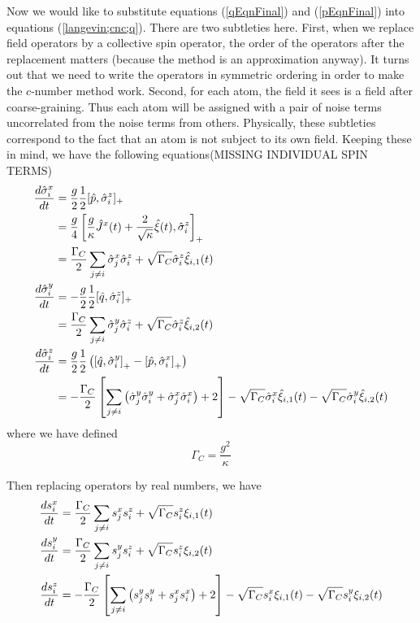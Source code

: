 \documentclass{article}
\newcommand{\gc}{\Gamma_C}
\begin{document}
Now we would like to substitute equations (\ref{qEqnFinal}) and (\ref{pEqnFinal}) into equations (\ref{langevin;cnc;q}). There are two subtleties here. First, when we replace field operators by a collective spin operator, the order of the operators after the replacement matters (because the method is an approximation anyway). It turns out that we need to write the operators in symmetric ordering in order to make the $c$-number method work. Second, for each atom, the field it sees is a field after coarse-graining. Thus each atom will be assigned with a pair of noise terms uncorrelated from the noise terms from others. Physically, these subtleties correspond to the fact that an atom is not subject to its own field. Keeping these in mind, we have the following equations(MISSING INDIVIDUAL SPIN TERMS)
\begin{align}
    \label{xyz}
    \notag \frac{d \hat{\sigma}_i^x}{dt} &= \frac{g}{2}\frac{1}{2}[\hat{p},\hat{\sigma}^z_i]_+\\
    \notag &=\frac{g}{4}\left[\frac{g}{\kappa}\hat{J}^x(t)+\frac{2}{\sqrt{\kappa}}\hat{\xi}(t),\hat{\sigma}^z_i\right]_+\\
          &=\frac{\gc}{2}\sum_{j\neq i}\hat{\sigma}_j^x\hat{\sigma}^z_i+\sqrt{\gc}\hat{\sigma}^z_i\hat{\xi}_{i,1}(t)\\
    \notag \frac{d \hat{\sigma}_i^y}{dt} &= -\frac{g}{2}\frac{1}{2}[\hat{q},\hat{\sigma}^z_i]_+\\
          &=\frac{\gc}{2}\sum_{j\neq i}\hat{\sigma}_j^y\hat{\sigma}^z_i+\sqrt{\gc}\hat{\sigma}^z_i\hat{\xi}_{i,2}(t)\\
     \frac{d \hat{\sigma}_i^z}{dt} &=
    \notag\frac{g}{2}\frac{1}{2}\left(\left[\hat{q},\hat{\sigma}^y_i\right]_+-\left[\hat{p},\hat{\sigma}_i^x\right]_+\right)\\
          &=-\frac{\gc}{2}\left[\sum_{j\neq i}\left(\hat{\sigma}_j^y\hat{\sigma}^y_i+\hat{\sigma}_j^x\hat{\sigma}^x_i\right)+2\right]-\sqrt{\gc}\hat{\sigma}^x_i\hat{\xi}_{i,1}(t)-\sqrt{\gc}\hat{\sigma}^y_i\hat{\xi}_{i,2}(t)
\end{align}
where we have defined 
\begin{equation}
    \gc = \frac{g^2}{\kappa}
\end{equation}

Then replacing operators by real numbers, we have
\begin{align}
    \label{langevin;cn} 
    \notag \frac{d s_i^x}{dt} &=\frac{\gc}{2}\sum_{j\neq i}s_j^xs^z_i+\sqrt{\gc}s^z_i\xi_{i,1}(t)\\
          \frac{d s_i^y}{dt} &=\frac{\gc}{2}\sum_{j\neq i}s_j^ys^z_i+\sqrt{\gc}s^z_i\xi_{i,2}(t)\\
    \notag \frac{d s_i^z}{dt} &=-\frac{\gc}{2}\left[\sum_{j\neq i}\left(s_j^ys^y_i+s_j^xs^x_i\right)+2\right]-\sqrt{\gc}s^x_i\xi_{i,1}(t)-\sqrt{\gc}s^y_i\xi_{i,2}(t)
\end{align}
\end{document}
